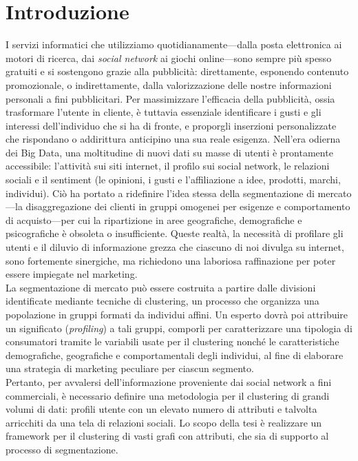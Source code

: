 \chapter{Introduzione}
\label{Introduzione}
\thispagestyle{empty}
I servizi informatici che utilizziamo quotidianamente---dalla posta elettronica ai motori di ricerca, dai \textit{social network} ai giochi online---sono sempre pi\`u spesso gratuiti e si sostengono grazie alla pubblicit\`a: direttamente, esponendo contenuto promozionale, o indirettamente, dalla valorizzazione delle nostre informazioni personali a fini pubblicitari. Per massimizzare l'efficacia della pubblicit\`a, ossia trasformare l'utente in cliente, \`e tuttavia essenziale identificare i gusti e gli interessi dell'individuo che si ha di fronte, e proporgli inserzioni personalizzate che rispondano o addirittura anticipino una sua reale esigenza. Nell'era odierna dei Big Data, una moltitudine di nuovi dati su masse di utenti \`e prontamente accessibile: l'attivit\`a sui siti internet, il profilo sui social network, le relazioni sociali e il sentiment (le opinioni, i gusti e l'affiliazione a idee, prodotti, marchi, individui).  Ci\`o ha portato a ridefinire l'idea stessa della segmentazione di mercato---la disaggregazione dei clienti in gruppi omogenei per esigenze e comportamento di acquisto---per cui la ripartizione in aree geografiche, demografiche e psicografiche \`e obsoleta o insufficiente. Queste realt\`a, la necessit\`a di profilare gli utenti e il diluvio di informazione grezza che ciascuno di noi divulga su internet, sono fortemente sinergiche, ma richiedono una laboriosa raffinazione per poter essere impiegate nel marketing.\\
La segmentazione di mercato pu\`o essere costruita a partire dalle divisioni identificate mediante tecniche di clustering, un processo che organizza una popolazione in gruppi formati da individui affini. Un esperto dovr\`a poi attribuire un significato (\textit{profiling}) a tali gruppi, comporli per caratterizzare una tipologia di consumatori tramite le variabili usate per il clustering nonch\'e le caratteristiche demografiche, geografiche e comportamentali degli individui, al fine di elaborare una strategia di marketing peculiare per ciascun segmento.\\
Pertanto, per avvalersi dell'informazione proveniente dai social network a fini commerciali, \`e necessario definire una metodologia per il clustering di grandi volumi di dati: profili utente con un elevato numero di attributi e talvolta arricchiti da una tela di relazioni sociali. Lo scopo della tesi \`e realizzare un framework per il clustering di vasti grafi con attributi, che sia di supporto al processo di segmentazione.\\
